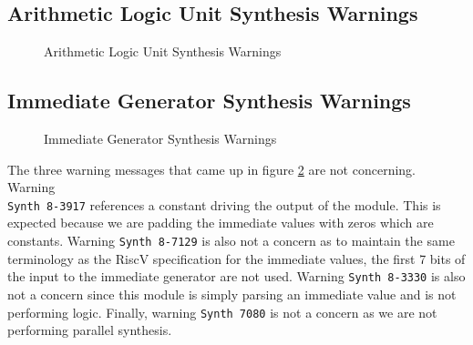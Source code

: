 \documentclass[
    a4paper, %
	12pt, %
    ]{CSSullivanBusinessReport}
\begin{document}
\begin{fullwidth}
\subsection{Arithmetic Logic Unit Synthesis Warnings} %
\begin{figure}[H]
    \captionsetup{style=widetable}
    \caption{Arithmetic Logic Unit Synthesis Warnings}
    \label{fig:ALUSynthesisWarnings}
\end{figure}

\subsection{Immediate Generator Synthesis Warnings} %
\begin{figure}[H]
    \captionsetup{style=widetable}
    \caption{Immediate Generator Synthesis Warnings}
    \label{fig:ImmdGenSynthesisWarnings}
\end{figure}

The three warning messages that came up in figure \ref{fig:ImmdGenSynthesisWarnings} are not concerning. Warning \\\verb|Synth 8-3917| references a constant driving the output of the module. This is expected because we are padding the immediate values with zeros which are constants. Warning \verb|Synth 8-7129| is also not a concern as to maintain the same terminology as the RiscV specification for the immediate values, the first 7 bits of the input to the immediate generator are not used. Warning \verb|Synth 8-3330| is also not a concern since this module is simply parsing an immediate value and is not performing logic. Finally, warning \verb|Synth 7080| is not a concern as we are not performing parallel synthesis.  

\end{fullwidth}
\end{document}
